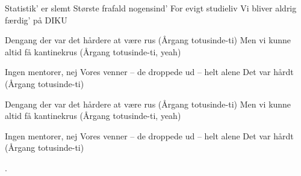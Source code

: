 \documentclass[a4paper,11pt]{article}
\begin{document}
\begin{song}
 Statistik' er slemt
 Største frafald nogensind'
 For evigt studieliv
 Vi bliver aldrig færdig' på DIKU

 Dengang der var det hårdere at være rus
 (Årgang totusinde-ti)
 Men vi kunne altid få kantinekrus
 (Årgang totusinde-ti, yeah)

 Ingen mentorer,  nej
 Vores venner --  de droppede ud --  helt alene
 Det var hårdt
 (Årgang totusinde-ti)


 Dengang der var det hårdere at være rus
 (Årgang totusinde-ti)
 Men vi kunne altid få kantinekrus
 (Årgang totusinde-ti, yeah)

 Ingen mentorer, nej
 Vores venner -- de droppede ud -- helt alene
 Det var hårdt
 (Årgang totusinde-ti)

.

\end{song}
\end{document}
